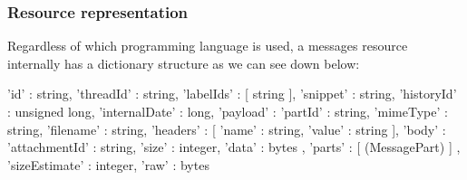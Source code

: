 \subsubsection{Resource representation}\label{sssect:msgresrep}

Regardless of which programming language is used, a messages resource \citep[/v1/reference/users/messages]{gmailAPI} internally has a dictionary structure as we can see down below:

\begin{python}
{
'id' : string,
'threadId' : string,
'labelIds' : [ string ],
'snippet' : string,
'historyId' : unsigned long,
'internalDate' : long,
'payload' : {
	'partId' : string,
	'mimeType' : string,
	'filename' : string,
	'headers' : [
		{
		'name' : string,
		'value' : string
		}
	],
	'body' : {
		'attachmentId' : string,
		'size' : integer,
		'data' : bytes
	},
	'parts' : [ (MessagePart) ]
	},
'sizeEstimate' : integer,
'raw' : bytes
}
\end{python}


